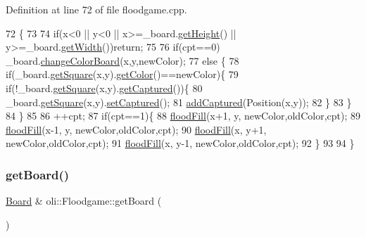 Definition at line 72 of file floodgame.\+cpp.


\begin{DoxyCode}
72                                                                           \{
73 
74     \textcolor{keywordflow}{if}(x<0 || y<0 || x>=\_board.\hyperlink{classoli_1_1_board_a17dce7dacfe888f52dfad0468ae51ace}{getHeight}() || y>=\_board.\hyperlink{classoli_1_1_board_a228d72d2aa8a9df2f545ecef14e72a0d}{getWidth}())\textcolor{keywordflow}{return};
75 
76     \textcolor{keywordflow}{if}(cpt==0) \_board.\hyperlink{classoli_1_1_board_a8c5091c12a29718d580db501f09592c8}{changeColorBoard}(x,y,newColor);
77     \textcolor{keywordflow}{else} \{
78         \textcolor{keywordflow}{if}(\_board.\hyperlink{classoli_1_1_board_a5c1ce624776b1169ee16d8d815e9a453}{getSquare}(x,y).\hyperlink{classoli_1_1_square_a7709b35684fb5754e53d138bb916880c}{getColor}()==newColor)\{
79             \textcolor{keywordflow}{if}(!\_board.\hyperlink{classoli_1_1_board_a5c1ce624776b1169ee16d8d815e9a453}{getSquare}(x,y).\hyperlink{classoli_1_1_square_aa8ed3521a370df288e9085222660d7ea}{getCaptured}())\{
80                 \_board.\hyperlink{classoli_1_1_board_a5c1ce624776b1169ee16d8d815e9a453}{getSquare}(x,y).\hyperlink{classoli_1_1_square_a1c2449cd8855586cd63d6bde60873ce5}{setCaptured}();
81                 \hyperlink{classoli_1_1_floodgame_a257b5c182fe3c40242308a6b234b75c8}{addCaptured}(Position(x,y));
82             \}
83         \}
84     \}
85 
86     ++cpt;
87     \textcolor{keywordflow}{if}(cpt==1)\{
88         \hyperlink{classoli_1_1_floodgame_abf954b3e365ada491163de9ad956bd95}{floodFill}(x+1, y, newColor,oldColor,cpt);
89         \hyperlink{classoli_1_1_floodgame_abf954b3e365ada491163de9ad956bd95}{floodFill}(x-1, y, newColor,oldColor,cpt);
90         \hyperlink{classoli_1_1_floodgame_abf954b3e365ada491163de9ad956bd95}{floodFill}(x, y+1, newColor,oldColor,cpt);
91         \hyperlink{classoli_1_1_floodgame_abf954b3e365ada491163de9ad956bd95}{floodFill}(x, y-1, newColor,oldColor,cpt);
92     \}
93 
94 \}
\end{DoxyCode}
\hypertarget{classoli_1_1_floodgame_a4775f2321f034778d4de93a888d2283b}{}\label{classoli_1_1_floodgame_a4775f2321f034778d4de93a888d2283b} 
\subsubsection{\texorpdfstring{get\+Board()}{getBoard()}}
{\footnotesize\ttfamily \hyperlink{classoli_1_1_board}{Board} \& oli\+::\+Floodgame\+::get\+Board (\begin{DoxyParamCaption}{ }\end{DoxyParamCaption})}



